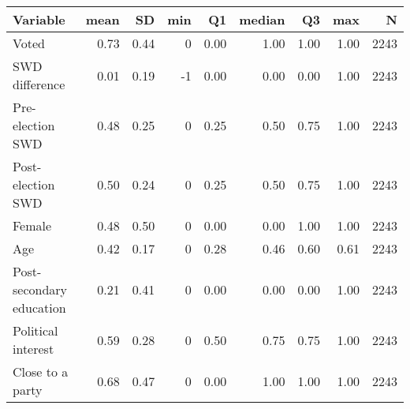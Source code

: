 
\begin{tabular}{l|r|r|r|r|r|r|r|r}
\hline
Variable & mean & SD & min & Q1 & median & Q3 & max & N\\
\hline
Voted & 0.73 & 0.44 & 0 & 0.00 & 1.00 & 1.00 & 1.00 & 2243\\
\hline
SWD difference & 0.01 & 0.19 & -1 & 0.00 & 0.00 & 0.00 & 1.00 & 2243\\
\hline
Pre-election SWD & 0.48 & 0.25 & 0 & 0.25 & 0.50 & 0.75 & 1.00 & 2243\\
\hline
Post-election SWD & 0.50 & 0.24 & 0 & 0.25 & 0.50 & 0.75 & 1.00 & 2243\\
\hline
Female & 0.48 & 0.50 & 0 & 0.00 & 0.00 & 1.00 & 1.00 & 2243\\
\hline
Age & 0.42 & 0.17 & 0 & 0.28 & 0.46 & 0.60 & 0.61 & 2243\\
\hline
Post-secondary education & 0.21 & 0.41 & 0 & 0.00 & 0.00 & 0.00 & 1.00 & 2243\\
\hline
Political interest & 0.59 & 0.28 & 0 & 0.50 & 0.75 & 0.75 & 1.00 & 2243\\
\hline
Close to a party & 0.68 & 0.47 & 0 & 0.00 & 1.00 & 1.00 & 1.00 & 2243\\
\hline
\end{tabular}
